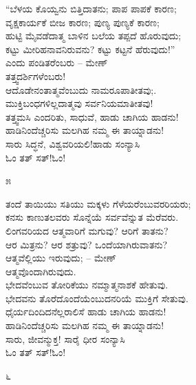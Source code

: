 \begin{myquote}
“ಬೆಳಯ ಕೊಯ್ವನು ಬಿತ್ತಿದಾತನು; ಪಾಪ ಪಾಪಕೆ ಕಾರಣ;\\ವೃಕ್ಷಕಾರ್ಯಕೆ ಬೀಜ ಕಾರಣ; ಪುಣ್ಯ ಪುಣ್ಯಕೆ ಕಾರಣ;\\ಹುಟ್ಟಿ ಮೈವಡೆದಾತ್ಮ ಬಾಳಿನ ಬಲೆಯ ತಪ್ಪದೆ ಹೊರುವುದು;\\ಕಟ್ಟು ಮೀರಿಹನಾವನಿರುವನು? ಕಟ್ಟು ಕಟ್ಟನೆ ಹೆರುವುದು!''\\ಎಂದು ಪಂಡಿತರೆಂಬರು – ಮೇಣ್\\ತತ್ತ್ವದರ್ಶಿಗಳೆಂಬರು!\\ಆದೊಡೇನಂತಾತ್ಮವೆಂಬುದು ನಾಮರೂಪಾತೀತವು;.\\ಮುಕ್ತಿಬಂಧಗಳಿಲ್ಲದಾತ್ಮವು ಸರ್ವನಿಯಮಾತೀತವು!\\ತತ್ತ್ವಮಸಿ ಎಂದರಿತು, ಸಾಧುವೆ, ಹಾಡು ಚಾಗಿಯ ಹಾಡನು!\\ಹಾಡಿನಿಂದೆಚ್ಚರಿಸು ಮಲಗಿಹ ನಮ್ಮ ಈ ತಾಯ್ನಾಡನು!\\ಸಾರು ಸಿದ್ಧನೆ, ವಿಶ್ವವರಿಯಲಿ!ಹಾಡು ಸಂನ್ಯಾಸಿ\\ಓಂ ತತ್ ಸತ್!ಓಂ!
\end{myquote}

\begin{center}
೫
\end{center}

\begin{myquote}
ತಂದೆ ತಾಯಿಯು ಸತಿಯು ಮಕ್ಕಳು ಗೆಳೆಯರೆಂಬುವರರಿಯರು;\\ಕನಸು ಕಾಣುತಲವರು ಸೊನ್ನೆಯೆ ಸರ್ವವೆನ್ನುತ ಮೆರೆವರು.\\ಲಿಂಗವರಿಯದ ಆತ್ಮವಾರಿಗೆ ಮಗುವು? ಆರಿಗೆ ತಾತನು?\\ಆರ ಮಿತ್ರನು? ಆರ ಶತ್ರುವು? ಒಂದೆಯಾಗಿರುವಾತನು?\\ಆತ್ಮವೆಲ್ಲಿಯು ಇರುವುದು; – ಮೇಣ್\\ಆತ್ಮವೊಂದಾಗಿರುವುದು.\\ಭೇದವೆಂಬುವ ತೋರಿಕೆಯು ನಮ್ಮಾತ್ಮನಾಶಕೆ ಹೇತುವು.\\ಭೇದವನು ತೊರೆದೊಂದೆಯೆಂಬುದನರಿಯೆ ಮುಕ್ತಿಗೆ ಸೇತುವು.\\ಧೈರ್ಯದಿಂದಿದನೆಲ್ಲರಾಲಿಸೆ ಹಾಡು ಚಾಗಿಯ ಹಾಡನು!\\ಹಾಡಿನಿಂದೆಚ್ಚರಿಸು ಮಲಗಿಹ ನಮ್ಮ ಈ ತಾಯ್ನಾಡನು!\\ಸಾರು, ಜೀವನ್ಮುಕ್ತ! ಸಾರೈ ಧೀರ ಸಂನ್ಯಾಸಿ\\ಓಂ ತತ್ ಸತ್!ಓಂ!
\end{myquote}

\begin{center}
೬
\end{center}

